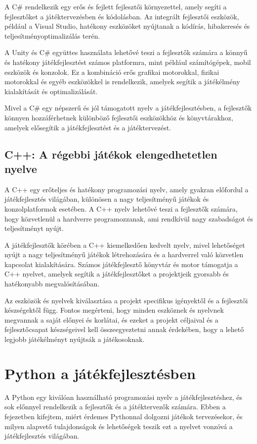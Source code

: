 A C\# rendelkezik egy erős és fejlett fejlesztői környezettel, amely segíti a fejlesztőket a játéktervezésben és kódolásban. Az integrált fejlesztői eszközök, például a Visual Studio, hatékony eszközöket nyújtanak a kódírás, hibakeresés és teljesítményoptimalizálás terén.

A Unity és C\# együttes használata lehetővé teszi a fejlesztők számára a könnyű és hatékony játékfejlesztést számos platformra, mint például számítógépek, mobil eszközök és konzolok. Ez a kombináció erős grafikai motorokkal, fizikai motorokkal és egyéb eszközökkel is rendelkezik, amelyek segítik a játékélmény kialakítását és optimalizálását.

Mivel a C\# egy népszerű és jól támogatott nyelv a játékfejlesztésben, a fejlesztők könnyen hozzáférhetnek különböző fejlesztői eszközökhöz és könyvtárakhoz, amelyek elősegítik a játékfejlesztést és a játéktervezést.
\subsection{C++: A régebbi játékok elengedhetetlen nyelve}\cite{cpp-doc}

A C++ egy erőteljes és hatékony programozási nyelv, amely gyakran előfordul a játékfejlesztés világában, különösen a nagy teljesítményű játékok és konzolplatformok esetében. A C++ nyelv lehetővé teszi a fejlesztők számára, hogy közvetlenül a hardverre programozzanak, ami rendkívül nagy szabadságot és teljesítményt nyújt.

A játékfejlesztők körében a C++ kiemelkedően kedvelt nyelv, mivel lehetőséget nyújt a nagy teljesítményű játékok létrehozására és a hardverrel való közvetlen kapcsolat kialakítására. Számos játékfejlesztő könyvtár és motor támogatja a C++ nyelvet, amelyek segítik a játékfejlesztőket a projektjeik gyorsabb és hatékonyabb megvalósításában.

Az eszközök és nyelvek kiválasztása a projekt specifikus igényektől és a fejlesztői készségektől függ. Fontos megérteni, hogy minden eszköznek és nyelvnek megvannak a saját előnyei és korlátai, és ezeket a projekt céljaival és a fejlesztőcsapat készségeivel kell összeegyeztetni annak érdekében, hogy a lehető legjobb játékélményt nyújtsák a játékosoknak.


\section{Python a játékfejlesztésben}

A Python egy kiválóan használható programozási nyelv a játékfejlesztéshez, és sok előnnyel rendelkezik a fejlesztők és a játéktervezők számára. Ebben a fejezetben kifejtem, miért érdemes Pythonnal dolgozni játékok tervezésekor, és milyen alapvető tulajdonságok és lehetőségek teszik ezt a nyelvet vonzóvá a játékfejlesztés világában.

